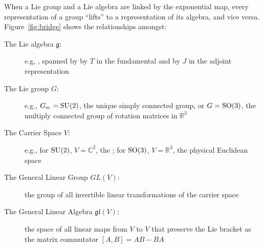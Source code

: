 \noindent When a Lie group and a Lie algebra are linked by the exponential map, every
representation of a group ``lifts'' to a representation of its algebra, and vice
versa. Figure~\ref{fig:bridge} shows the relationships amongst:

\begin{description}%
    \item[The Lie algebra $\mathfrak{g}$:] e.g, , spanned by by $T$ in the fundamental 
        and by $J$ in the adjoint representation
    \item[The Lie group $G$:] e.g., $G_{\text{sc}}=\mathrm{SU}(2)$, the unique simply connected
        group, or $G=\mathrm{SO}(3)$, the multiply connected group of rotation
        matrices in $\mathbb{R}^3$
    \item[The Carrier Space $V$:] e.g., for $\mathrm{SU}(2)$, $V = \mathbb{C}^2$, the 
        ; for $\mathrm{SO}(3)$, $V = \mathbb{R}^3$, the physical Euclidean space
    \item[The General Linear Group $GL(V)$:] the group of all invertible linear transformations
        of the carrier space
    \item[The General Linear Algebra $\mathfrak{gl}(V)$:] the space of all linear maps from $V$
        to $V$ that preserve the Lie bracket as the matrix commutator $[A,B]=AB-BA$
\end{description}

